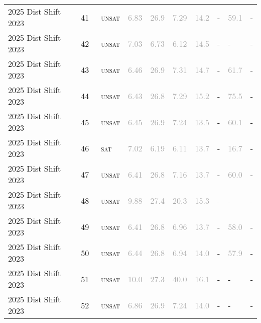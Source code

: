 \begin{center}
{\begin{longtable}{@{}llllllllll@{}}
2025 Dist Shift 2023 & 41 & ~\textsc{unsat} & \textcolor{darkgray}{6.83} & \textcolor{darkgray}{26.9} & \textcolor{darkgray}{7.29} & \textcolor{darkgray}{14.2} & - & \textcolor{darkgray}{59.1} & - \\
2025 Dist Shift 2023 & 42 & ~\textsc{unsat} & \textcolor{darkgray}{7.03} & \textcolor{darkgray}{6.73} & \textcolor{darkgray}{6.12} & \textcolor{darkgray}{14.5} & - & - & - \\
2025 Dist Shift 2023 & 43 & ~\textsc{unsat} & \textcolor{darkgray}{6.46} & \textcolor{darkgray}{26.9} & \textcolor{darkgray}{7.31} & \textcolor{darkgray}{14.7} & - & \textcolor{darkgray}{61.7} & - \\
2025 Dist Shift 2023 & 44 & ~\textsc{unsat} & \textcolor{darkgray}{6.43} & \textcolor{darkgray}{26.8} & \textcolor{darkgray}{7.29} & \textcolor{darkgray}{15.2} & - & \textcolor{darkgray}{75.5} & - \\
2025 Dist Shift 2023 & 45 & ~\textsc{unsat} & \textcolor{darkgray}{6.45} & \textcolor{darkgray}{26.9} & \textcolor{darkgray}{7.24} & \textcolor{darkgray}{13.5} & - & \textcolor{darkgray}{60.1} & - \\
2025 Dist Shift 2023 & 46 & ~\textsc{sat} & \textcolor{darkgray}{7.02} & \textcolor{darkgray}{6.19} & \textcolor{darkgray}{6.11} & \textcolor{darkgray}{13.7} & - & \textcolor{darkgray}{16.7} & - \\
2025 Dist Shift 2023 & 47 & ~\textsc{unsat} & \textcolor{darkgray}{6.41} & \textcolor{darkgray}{26.8} & \textcolor{darkgray}{7.16} & \textcolor{darkgray}{13.7} & - & \textcolor{darkgray}{60.0} & - \\
2025 Dist Shift 2023 & 48 & ~\textsc{unsat} & \textcolor{darkgray}{9.88} & \textcolor{darkgray}{27.4} & \textcolor{darkgray}{20.3} & \textcolor{darkgray}{15.3} & - & - & - \\
2025 Dist Shift 2023 & 49 & ~\textsc{unsat} & \textcolor{darkgray}{6.41} & \textcolor{darkgray}{26.8} & \textcolor{darkgray}{6.96} & \textcolor{darkgray}{13.7} & - & \textcolor{darkgray}{58.0} & - \\
2025 Dist Shift 2023 & 50 & ~\textsc{unsat} & \textcolor{darkgray}{6.44} & \textcolor{darkgray}{26.8} & \textcolor{darkgray}{6.94} & \textcolor{darkgray}{14.0} & - & \textcolor{darkgray}{57.9} & - \\
2025 Dist Shift 2023 & 51 & ~\textsc{unsat} & \textcolor{darkgray}{10.0} & \textcolor{darkgray}{27.3} & \textcolor{darkgray}{40.0} & \textcolor{darkgray}{16.1} & - & - & - \\
2025 Dist Shift 2023 & 52 & ~\textsc{unsat} & \textcolor{darkgray}{6.86} & \textcolor{darkgray}{26.9} & \textcolor{darkgray}{7.24} & \textcolor{darkgray}{14.0} & - & - & - \\

\end{longtable}}
\end{center}
